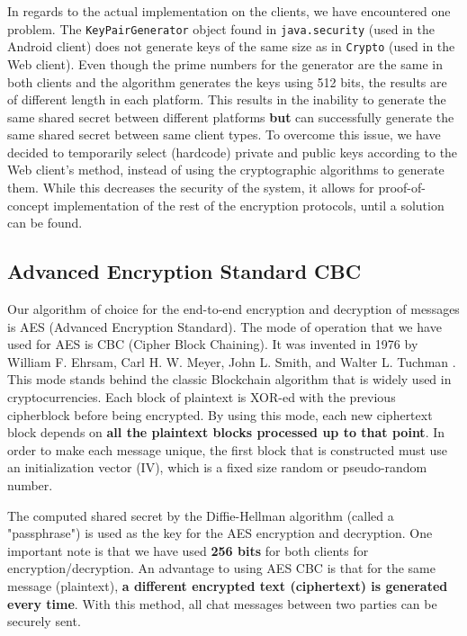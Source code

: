 In regards to the actual implementation on the clients, we have encountered one problem. The \verb|KeyPairGenerator| object found in \verb|java.security| (used in the Android client) does not generate keys of the same size as in \verb|Crypto| (used in the Web client). Even though the prime numbers for the generator are the same in both clients and the algorithm generates the keys using 512 bits, the results are of different length in each platform. This results in the inability to generate the same shared secret between different platforms \textbf{but} can successfully generate the same shared secret between same client types. To overcome this issue, we have decided to temporarily select (hardcode) private and public keys according to the Web client's method, instead of using the cryptographic algorithms to generate them. While this decreases the security of the system, it allows for proof-of-concept implementation of the rest of the encryption protocols, until a solution can be found.

\subsection{Advanced Encryption Standard CBC}

Our algorithm of choice for the end-to-end encryption and decryption of messages is AES (Advanced Encryption Standard). The mode of operation that we have used for AES is CBC (Cipher Block Chaining). It was invented in 1976 by William F. Ehrsam, Carl H. W. Meyer, John L. Smith, and Walter L. Tuchman \cite{aes-cbc-patent}. This mode stands behind the classic Blockchain algorithm that is widely used in cryptocurrencies. Each block of plaintext is XOR-ed with the previous cipherblock before being encrypted. By using this mode, each new ciphertext block depends on \textbf{all the plaintext blocks processed up to that point}. In order to make each message unique, the first block that is constructed must use an initialization vector (IV), which is a fixed size random or pseudo-random number. 


The computed shared secret by the Diffie-Hellman algorithm (called a "passphrase") is used as the key for the AES encryption and decryption. One important note is that we have used \textbf{256 bits} for both clients for encryption/decryption. An advantage to using AES CBC is that for the same message (plaintext), \textbf{a different encrypted text (ciphertext) is generated every time}. With this method, all chat messages between two parties can be securely sent.

